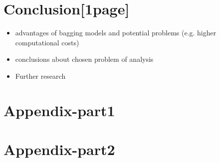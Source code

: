 \documentclass[12pt]{article}
\begin{document}
\section{Conclusion[1page]}
\begin{itemize}
\item advantages of bagging models and potential problems (e.g. higher computational costs)
\item conclusions about chosen problem of analysis
\item Further research	
\end{itemize}






\appendix
\section{Appendix-part1}

\section{Appendix-part2}

\clearpage


\end{document}
